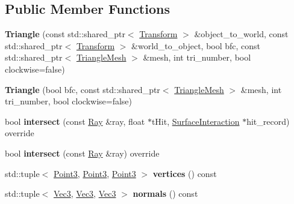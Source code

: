 \subsection*{Public Member Functions}
\begin{DoxyCompactItemize}
\item 
\mbox{\label{classomg_1_1_triangle_acc63dd9acf6fd80a9e216e2e73de3c14}} 
{\bfseries Triangle} (const std\+::shared\+\_\+ptr$<$ \mbox{\hyperlink{classomg_1_1_transform}{Transform}} $>$ \&object\+\_\+to\+\_\+world, const std\+::shared\+\_\+ptr$<$ \mbox{\hyperlink{classomg_1_1_transform}{Transform}} $>$ \&world\+\_\+to\+\_\+object, bool bfc, const std\+::shared\+\_\+ptr$<$ \mbox{\hyperlink{structomg_1_1_triangle_mesh}{Triangle\+Mesh}} $>$ \&mesh, int tri\+\_\+number, bool clockwise=false)
\item 
\mbox{\label{classomg_1_1_triangle_acdf8c1867f7cf9b0e9610b94a0a96f76}} 
{\bfseries Triangle} (bool bfc, const std\+::shared\+\_\+ptr$<$ \mbox{\hyperlink{structomg_1_1_triangle_mesh}{Triangle\+Mesh}} $>$ \&mesh, int tri\+\_\+number, bool clockwise=false)
\item 
\mbox{\label{classomg_1_1_triangle_ad22556418d61acfe7aa67d3bb0a5cb40}} 
bool {\bfseries intersect} (const \mbox{\hyperlink{classomg_1_1_ray}{Ray}} \&ray, float $\ast$t\+Hit, \mbox{\hyperlink{classomg_1_1_surface_interaction}{Surface\+Interaction}} $\ast$hit\+\_\+record) override
\item 
\mbox{\label{classomg_1_1_triangle_a4f269b31b840a553da91c5085fd10542}} 
bool {\bfseries intersect} (const \mbox{\hyperlink{classomg_1_1_ray}{Ray}} \&ray) override
\item 
\mbox{\label{classomg_1_1_triangle_a20dd65bc222d4ca0cc14d99d8165e0cd}} 
std\+::tuple$<$ \mbox{\hyperlink{namespaceomg_af85242d35fdacf829d32a6f9b95f3e35}{Point3}}, \mbox{\hyperlink{namespaceomg_af85242d35fdacf829d32a6f9b95f3e35}{Point3}}, \mbox{\hyperlink{namespaceomg_af85242d35fdacf829d32a6f9b95f3e35}{Point3}} $>$ {\bfseries vertices} () const
\item 
\mbox{\label{classomg_1_1_triangle_a84b4f9d9508f0f87d9cd214cc27c74f6}} 
std\+::tuple$<$ \mbox{\hyperlink{namespaceomg_a45a9482677fee9933ff369b49894e316}{Vec3}}, \mbox{\hyperlink{namespaceomg_a45a9482677fee9933ff369b49894e316}{Vec3}}, \mbox{\hyperlink{namespaceomg_a45a9482677fee9933ff369b49894e316}{Vec3}} $>$ {\bfseries normals} () const

\end{DoxyCompactItemize}
